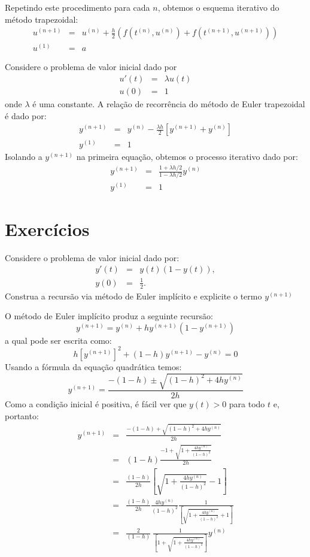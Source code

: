 Repetindo este procedimento para cada $n$, obtemos o esquema iterativo do método trapezoidal:
\begin{eqnarray}
  u^{(n+1)} &=& u^{(n)} +  \frac{h}{2} \left(f(t^{(n)},u^{(n)})+f(t^{(n+1)},u^{(n+1)})\right)\\
  u^{(1)} &=&a
\end{eqnarray}


\begin{ex} Considere o problema de valor inicial dado por
\begin{eqnarray}
u'(t)&=& \lambda u(t) \\
u(0)&=&1
\end{eqnarray}
onde $\lambda$ é uma constante. A relação de recorrência do método de Euler trapezoidal é dado por:
\begin{eqnarray*}
 y^{(n+1)}&=&y^{(n)}-\frac{\lambda h}{2} \left[y^{(n+1)}+y^{(n)}\right]\\
 y^{(1)}&=&1
\end{eqnarray*}
Isolando a $y^{(n+1)}$ na primeira equação, obtemos o processo iterativo dado por:
\begin{eqnarray*}
 y^{(n+1)}&=&\frac{1+ \lambda h/2}{1-\lambda h/2}y^{(n)}\\
 y^{(1)}&=&1
\end{eqnarray*}
\end{ex}
\section*{Exercícios}
\begin{exer}
 Considere o problema de valor inicial dado por:
 \begin{eqnarray*}
  y'(t)&=&y(t)\left(1-y(t)\right),\\
  y(0)&=&\frac{1}{2}.
 \end{eqnarray*}
Construa a recursão via método de Euler implícito e explicite o termo $y^{(n+1)}$
\end{exer}
\begin{resp}
 O método de Euler implícito produz a seguinte recursão:
 $$y^{(n+1)}=y^{(n)}+h y^{(n+1)}\left(1-y^{(n+1)}\right)$$
 a qual pode ser escrita como:
 $$h\left[y^{(n+1)}\right]^2+ (1-h)y^{(n+1)}-y^{(n)}=0$$
 Usando a fórmula da equação quadrática temos:
 $$y^{(n+1)}= \frac{-(1-h)\pm \sqrt{(1-h)^2+4hy^{(n)}}}{2h}$$
Como a condição inicial é positiva, é fácil ver que $y(t)>0$ para todo $t$ e, portanto:
 \begin{eqnarray*}
y^{(n+1)}&=& \frac{-(1-h)+ \sqrt{(1-h)^2+4hy^{(n)}}}{2h}\\
&=&  (1-h) \frac{-1+ \sqrt{1+ \frac{4hy^{(n)}}{(1-h)^2} }}{2h}\\
&=&  \frac{(1-h)}{2h} \left[\sqrt{1+ \frac{4hy^{(n)}}{(1-h)^2} }-1\right]\\
&=&  \frac{(1-h)}{2h} \frac{4hy^{(n)}}{(1-h)^2} \frac{1}{\left[\sqrt{1+ \frac{4hy^{(n)}}{(1-h)^2} }+1\right]}\\
&=&  \frac{2}{(1-h)} \ \frac{1}{\left[1+\sqrt{1+ \frac{4hy^{(n)}}{(1-h)^2} }\right]}y^{(n)}\\
 \end{eqnarray*}
\end{resp}

